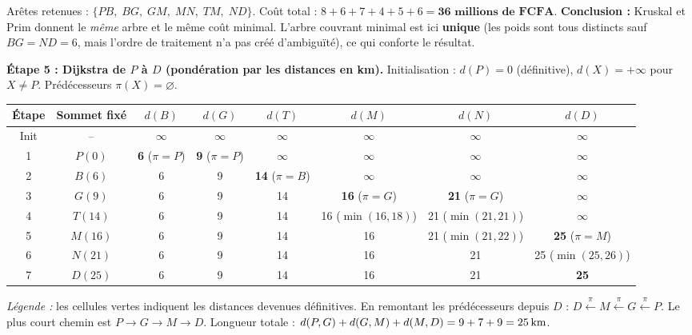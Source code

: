 \documentclass[11pt]{article}
\begin{document}
\begin{exoresolu}
Arêtes retenues : $\{PB,\; BG,\; GM,\; MN,\; TM,\; ND\}$.
Coût total : $8+6+7+4+5+6 = \textbf{36 millions de FCFA}$.
\textbf{Conclusion :} Kruskal et Prim donnent le \emph{même} arbre et le même coût minimal. L'arbre couvrant minimal est ici \textbf{unique} (les poids sont tous distincts sauf $BG=ND=6$, mais l'ordre de traitement n'a pas créé d'ambiguïté), ce qui conforte le résultat.

\textbf{Étape 5 : Dijkstra de $P$ à $D$ (pondération par les distances en km).}
Initialisation : $d(P)=0$ (définitive), $d(X)=+\infty$ pour $X\neq P$. Prédécesseurs $\pi(X)=\varnothing$.

\begin{center}
\begin{tabular}{|c|c|c|c|c|c|c|c|}
\hline
\rowcolor{popblueL} \textbf{Étape} & \textbf{Sommet fixé} & $d(B)$ & $d(G)$ & $d(T)$ & $d(M)$ & $d(N)$ & $d(D)$ \\
\hline
Init & -- & $\infty$ & $\infty$ & $\infty$ & $\infty$ & $\infty$ & $\infty$ \\
\hline
1 & $P(0)$ & \textbf{6} ($\pi=P$) & \textbf{9} ($\pi=P$) & $\infty$ & $\infty$ & $\infty$ & $\infty$ \\
\hline
2 & $B(6)$ & \cellcolor{popgreenL}6 & 9 & \textbf{14} ($\pi=B$) & $\infty$ & $\infty$ & $\infty$ \\
\hline
3 & $G(9)$ & \cellcolor{popgreenL}6 & \cellcolor{popgreenL}9 & 14 & \textbf{16} ($\pi=G$) & \textbf{21} ($\pi=G$) & $\infty$ \\
\hline
4 & $T(14)$ & \cellcolor{popgreenL}6 & \cellcolor{popgreenL}9 & \cellcolor{popgreenL}14 & 16 ($\min(16,18)$) & 21 ($\min(21,21)$) & $\infty$ \\
\hline
5 & $M(16)$ & \cellcolor{popgreenL}6 & \cellcolor{popgreenL}9 & \cellcolor{popgreenL}14 & \cellcolor{popgreenL}16 & 21 ($\min(21,22)$) & \textbf{25} ($\pi=M$) \\
\hline
6 & $N(21)$ & \cellcolor{popgreenL}6 & \cellcolor{popgreenL}9 & \cellcolor{popgreenL}14 & \cellcolor{popgreenL}16 & \cellcolor{popgreenL}21 & 25 ($\min(25,26)$) \\
\hline
7 & $D(25)$ & \cellcolor{popgreenL}6 & \cellcolor{popgreenL}9 & \cellcolor{popgreenL}14 & \cellcolor{popgreenL}16 & \cellcolor{popgreenL}21 & \cellcolor{popgreenL}\textbf{25} \\
\hline
\end{tabular}
\end{center}

\emph{Légende :} les cellules vertes indiquent les distances devenues définitives.
En remontant les prédécesseurs depuis $D$ : $D \xleftarrow{\pi} M \xleftarrow{\pi} G \xleftarrow{\pi} P$.
Le plus court chemin est $P \to G \to M \to D$.
Longueur totale : $d(P,G)+d(G,M)+d(M,D) = 9 + 7 + 9 = \textbf{\SI{25}{km}}$.


\end{exoresolu}
\end{document}

